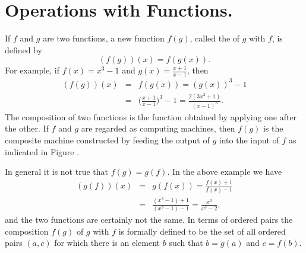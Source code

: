\section{Operations with Functions.}\label{sec 1.3}
If $f$ and $g$ are two functions,
a new function $f(g)$,
called the  of $g$ with $f$,
is defined by
\[
(f(g))(x) = f(g(x)).
\]
For example,
if $f(x) = x^3 - 1$ and $g(x) = \frac{x + 1}{x - 1}$,
then
\begin{eqnarray}
\label{eq1.3.1}
(f(g))(x)
&=& f(g(x))
 = (g(x))^3 - 1 \\
&=& \biggl( \frac{x + 1}{x - 1}\biggr)^3 - 1
 = \frac{2(3x^2 + 1)}{(x - 1)^3} . 
\end{eqnarray}
The composition of two functions
is the function obtained by applying one after the other.
If $f$ and $g$ are regarded as computing machines,
then $f(g)$ is the composite machine
constructed by feeding the output of $g$
into the input of $f$
as indicated in Figure .

In general it is not true that $f(g) = g(f)$.
In the above example we have
\begin{eqnarray}
\label{eq1.3.2}
(g(f))(x)
&=& g(f(x)) 
 = \frac{f(x) + 1}{f(x) - 1} \\
&=& \frac{(x^3 - 1) + 1}{(x^3 - 1) - 1}
 = \frac{x^3}{x^3 - 2} ,  
\end{eqnarray}
and the two functions are certainly not the same.
In terms of ordered pairs the composition $f(g)$ of $g$ with $f$
is formally defined to be
the set of all ordered pairs $(a, c)$
for which there is an element $b$
such that $b = g(a)$ and $c = f(b)$.

